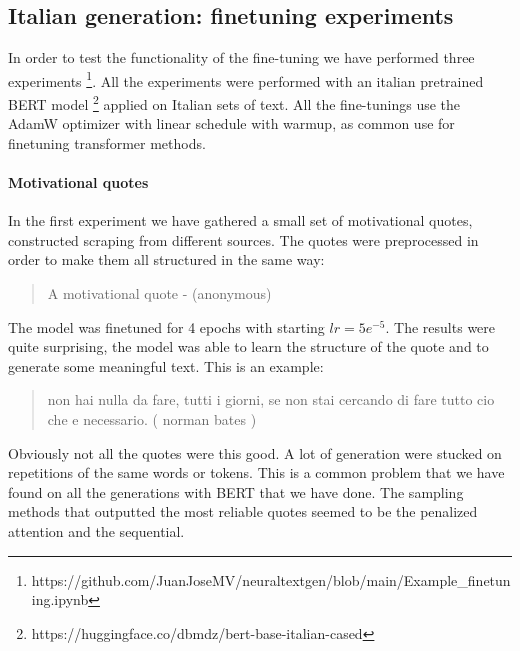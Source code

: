 \documentclass[10pt,twocolumn,letterpaper]{article}
\begin{document}
\subsection{Italian generation: finetuning experiments}
In order to test the functionality of the fine-tuning we have performed three experiments
\footnote[1]{https://github.com/JuanJoseMV/neuraltextgen/blob/main/Example\_finetuning.ipynb}.
All the experiments were performed with an italian pretrained BERT model
\footnote[2]{https://huggingface.co/dbmdz/bert-base-italian-cased}
applied on Italian sets of text.
All the fine-tunings use the AdamW optimizer with linear schedule with warmup, as common use for finetuning transformer methods.

\paragraph{Motivational quotes} In the first experiment we have gathered a small set of motivational quotes,
constructed scraping from different sources. The quotes were preprocessed in order to make them
all structured in the same way:
\begin{quote}
   A motivational quote - (anonymous)
\end{quote}

The model was finetuned for 4 epochs with starting $lr=5e^{-5}$. The results were quite surprising,
the model was able to learn the structure of the quote and to generate some meaningful text.
This is an example:

\begin{quote}
non hai nulla da fare, tutti i giorni, se non stai cercando di fare tutto cio che e necessario. ( norman bates )
\end{quote}

Obviously not all the quotes were this good.
A lot of generation were stucked on repetitions of the same words or tokens.
This is a common problem that we have found on all the generations with BERT that we have done.
The sampling methods that outputted the most reliable quotes seemed to be the penalized attention and the sequential.
\end{document}
